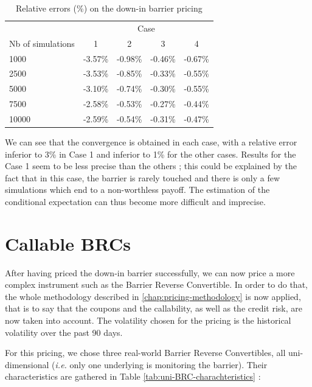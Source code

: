 \documentclass[a4paper,11pt,english]{book}
\begin{document}
\begin{table}
\centering
\begin{tabular}{l c c c c} 
& \multicolumn{4}{c}{Case} \\ 
\cmidrule(l){2-5} 
Nb of simulations & 1 & 2 & 3 & 4\\ %
\midrule %
1000 & -3.57\% & -0.98\% & -0.46\% & -0.67\%\\ %
2500 & -3.53\% & -0.85\% & -0.33\% & -0.55\%\\ %
5000 & -3.10\% & -0.74\% & -0.30\% & -0.55\%\\ %
7500 & -2.58\% & -0.53\% & -0.27\% & -0.44\%\\ %
10000 & -2.59\% & -0.54\% & -0.31\% & -0.47\%\\ %
\bottomrule %
\end{tabular}
\caption{Relative errors (\%) on the down-in barrier pricing}
\label{tab:barrier-option-pricing}
\end{table}

We can see that the convergence is obtained in each case, with a relative error inferior to 3\% in Case 1 and inferior to 1\% for the other cases. Results for the Case 1 seem to be less precise than the others ; this could be explained by the fact that in this case, the barrier is rarely touched and there is only a few simulations which end to a non-worthless payoff. The estimation of the conditional expectation can thus become more difficult and imprecise.

\section{Callable BRCs}
\label{sec:callable-BRC}
After having priced the down-in barrier successfully, we can now price a more complex instrument such as the Barrier Reverse Convertible. In order to do that, the whole methodology described in \ref{chap:pricing-methodology} is now applied, that is to say that the coupons and the callability, as well as the credit risk, are now taken into account. The volatility chosen for the pricing is the historical volatility over the past 90 days.

For this pricing, we chose three real-world Barrier Reverse Convertibles, all uni-dimensional (\textit{i.e.} only one underlying is monitoring the barrier). Their characteristics are gathered in Table \ref{tab:uni-BRC-charachteristics} :
\end{document}

